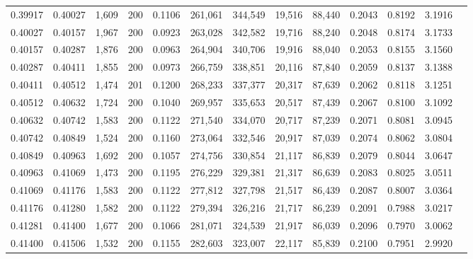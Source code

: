 \begin{tabular}{rrrrrrrrrrrrr}
0.39917 & 0.40027 & 1,609 & 200 &                                     0.1106 & 261,061 & 344,549 &  19,516 &  88,440 & 0.2043 & 0.8192 & 3.1916 \\
0.40027 & 0.40157 & 1,967 & 200 &                                     0.0923 & 263,028 & 342,582 &  19,716 &  88,240 & 0.2048 & 0.8174 & 3.1733 \\
0.40157 & 0.40287 & 1,876 & 200 &                                     0.0963 & 264,904 & 340,706 &  19,916 &  88,040 & 0.2053 & 0.8155 & 3.1560 \\
0.40287 & 0.40411 & 1,855 & 200 &                                     0.0973 & 266,759 & 338,851 &  20,116 &  87,840 & 0.2059 & 0.8137 & 3.1388 \\
0.40411 & 0.40512 & 1,474 & 201 &                                     0.1200 & 268,233 & 337,377 &  20,317 &  87,639 & 0.2062 & 0.8118 & 3.1251 \\
0.40512 & 0.40632 & 1,724 & 200 &                                     0.1040 & 269,957 & 335,653 &  20,517 &  87,439 & 0.2067 & 0.8100 & 3.1092 \\
0.40632 & 0.40742 & 1,583 & 200 &                                     0.1122 & 271,540 & 334,070 &  20,717 &  87,239 & 0.2071 & 0.8081 & 3.0945 \\
0.40742 & 0.40849 & 1,524 & 200 &                                     0.1160 & 273,064 & 332,546 &  20,917 &  87,039 & 0.2074 & 0.8062 & 3.0804 \\
0.40849 & 0.40963 & 1,692 & 200 &                                     0.1057 & 274,756 & 330,854 &  21,117 &  86,839 & 0.2079 & 0.8044 & 3.0647 \\
0.40963 & 0.41069 & 1,473 & 200 &                                     0.1195 & 276,229 & 329,381 &  21,317 &  86,639 & 0.2083 & 0.8025 & 3.0511 \\
0.41069 & 0.41176 & 1,583 & 200 &                                     0.1122 & 277,812 & 327,798 &  21,517 &  86,439 & 0.2087 & 0.8007 & 3.0364 \\
0.41176 & 0.41280 & 1,582 & 200 &                                     0.1122 & 279,394 & 326,216 &  21,717 &  86,239 & 0.2091 & 0.7988 & 3.0217 \\
0.41281 & 0.41400 & 1,677 & 200 &                                     0.1066 & 281,071 & 324,539 &  21,917 &  86,039 & 0.2096 & 0.7970 & 3.0062 \\
0.41400 & 0.41506 & 1,532 & 200 &                                     0.1155 & 282,603 & 323,007 &  22,117 &  85,839 & 0.2100 & 0.7951 & 2.9920 \\

\end{tabular}
